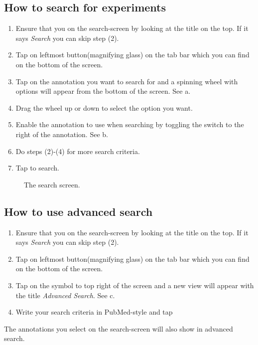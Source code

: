 \subsection{How to search for experiments}

\begin{enumerate}
\item Ensure that you on the search-screen by looking at the title on the top. If it says \emph{Search} you can skip step (2). 
\item Tap on leftmost button(magnifying glass) on the tab bar which you can find on the bottom of the screen.
\item Tap on the annotation you want to search for and a spinning wheel with options will appear from the bottom of the screen. See a.
\item Drag the wheel up or down to select the option you want.
\item Enable the annotation to use when searching by toggling the switch to the right of the annotation. See b.
\item Do steps (2)-(4) for more search criteria.
\item Tap  to search.
\end{enumerate}

\begin{figure}[ht]
\caption{The search screen.}
\label{fig:ios_search}
\end{figure}
\FloatBarrier

\subsection{How to use advanced search}

\begin{enumerate}
\item Ensure that you on the search-screen by looking at the title on the top. If it says \emph{Search} you can skip step (2). 
\item Tap on leftmost button(magnifying glass) on the tab bar which you can find on the bottom of the screen.
\item Tap on the symbol to top right of the screen and a new view will appear with the title \emph{Advanced Search}. See c.
\item Write your search criteria in PubMed-style and tap 
\end{enumerate}
The annotations you select on the search-screen will also show in advanced search.

